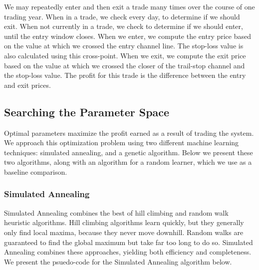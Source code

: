 \documentclass[12pt]{article}
\begin{document}
\pagebreak
We may repeatedly enter and then exit a trade many times over the course of one
trading year. When in a trade, we check every day, to determine if we should
exit.  When not currently in a trade, we check to determine if we should enter,
until the entry window closes. When we enter, we compute the entry price based
on the value at which we crossed the entry channel line. The stop-loss value is
also calculated using this cross-point. When we exit, we compute the exit price
based on the value at which we crossed the closer of the trail-stop channel and
the stop-loss value. The profit for this trade is the difference between the
entry and exit prices.

\subsection{Searching the Parameter Space}

Optimal parameters maximize the profit earned as a result of trading the
system.  We approach this optimization problem using two different machine
learning techniques: simulated annealing, and a genetic algorithm.  Below we
present these two algorithms, along with an algorithm for a random learner,
which we use as a baseline comparison.

\subsubsection{Simulated Annealing}

Simulated Annealing combines the best of hill climbing and random walk
heuristic algorithms.  Hill climbing algorithms learn quickly, but they
generally only find local maxima, because they never move downhill. Random
walks are guaranteed to find the global maximum but take far too long to do so.
Simulated Annealing combines these approaches, yielding both efficiency and
completeness.  We present the psuedo-code for the Simulated Annealing algorithm
below.
\end{document}
